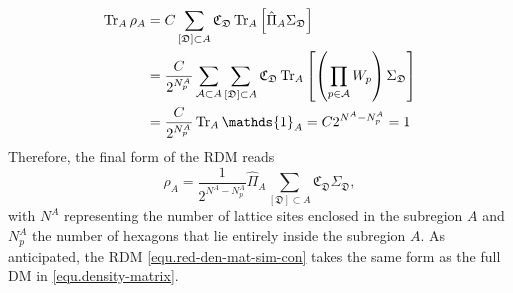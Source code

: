 \begin{align*}
    \Tr_A\rho_A &= C\sum_{[\mathfrak{D}]\subset A} \mathfrak{C}_\mathfrak{D} \Tr_A\lrm{\hat{\Pi}_A \Sigma_\mathfrak{D}} \\
    &= \frac{C}{2^{N^A_p}} \sum_{{\mathcal{A} \subset A}} \sum_{[\mathfrak{D}]\subset A} \mathfrak{C}_\mathfrak{D} \Tr_A\lrm{ \lr{\prod_{p\in\mathcal{A}}W_p} \Sigma_\mathfrak{D}} \\
    &= \frac{C}{2^{N^A_p}}\Tr_A\mathds{1}_A = C2^{N^A - N^A_p} = 1
\end{align*}
Therefore, the final form of the RDM reads
\begin{equation}\label{equ.red-den-mat-sim-con}
    \rho_A = \frac{1}{2^{N^A-N^A_p}} \hat{\Pi}_A\sum_{[\mathfrak{D}]\subset A}\mathfrak{C}_{\mathfrak{D}}\Sigma_{\mathfrak{D}},
\end{equation}
{with $N^A$ representing the number of lattice sites enclosed in the subregion $A$ and $N^A_p$ the number of hexagons that lie entirely inside the subregion $A$}. As anticipated, the RDM \eqref{equ.red-den-mat-sim-con} takes the same form as the full DM in \eqref{equ.density-matrix}.